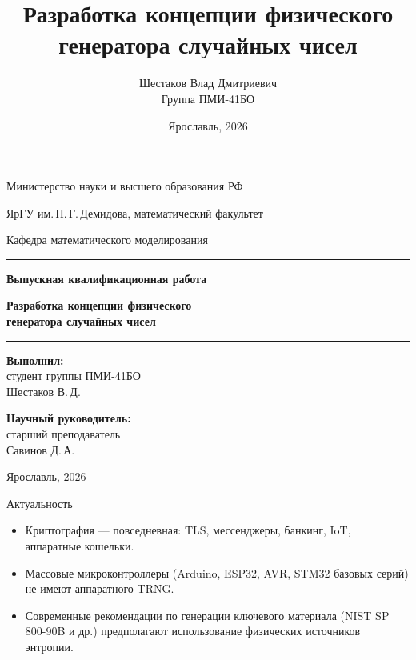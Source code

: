 \documentclass[14pt,aspectratio=169]{beamer}
\title{Разработка концепции физического\\генератора случайных чисел}
\author{Шестаков Влад Дмитриевич\\Группа ПМИ-41БО}
\institute{ЯрГУ им.\,П.\,Г.\,Демидова\\Математический факультет\\Кафедра математического моделирования}
\date{Ярославль, 2026}
\begin{document}
\begin{frame}[plain]
  \centering
  \vspace{0.5em}
  {\footnotesize Министерство науки и высшего образования РФ\par
   ЯрГУ им.\,П.\,Г.\,Демидова, математический факультет\par
   Кафедра математического моделирования\par}
  \vfill
  {\color{accent}\rule{0.9\linewidth}{0.6pt}}\par\vspace{0.5em}
  {\large\bfseries\color{accent} Выпускная квалификационная работа\par}
  \vspace{0.5em}
  {\normalsize\bfseries Разработка концепции физического\\генератора случайных чисел\par}
  \vspace{0.4em}
  {\color{accent}\rule{0.9\linewidth}{0.6pt}}\par
  \vfill
  {\footnotesize
  \begin{minipage}[t]{0.48\linewidth}\raggedright
    \textbf{Выполнил:}\\
    студент группы ПМИ-41БО\\
    Шестаков В.\,Д.
  \end{minipage}\hfill
  \begin{minipage}[t]{0.40\linewidth}\raggedright
    \textbf{Научный руководитель:}\\
    старший преподаватель\\
    Савинов Д.\,А.
  \end{minipage}\par}
  \vfill
  {\footnotesize Ярославль, 2026}
\end{frame}

\begin{frame}{Актуальность}
  \footnotesize
  \begin{itemize}
    \setlength{\itemsep}{0.4em}
    \item Криптография --- повседневная: TLS, мессенджеры, банкинг, IoT, аппаратные кошельки.
    \item Массовые микроконтроллеры (Arduino, ESP32, AVR, STM32 базовых серий) не имеют аппаратного TRNG.
    \item Современные рекомендации по генерации ключевого материала (NIST SP 800-90B и др.) предполагают использование физических источников энтропии.
  \end{itemize}
\end{frame}
\end{document}
